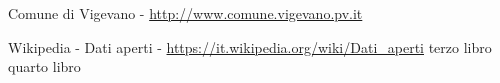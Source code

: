 \begin{thebibliography}{100}

 Comune di Vigevano - \url{http://www.comune.vigevano.pv.it}


  Wikipedia - Dati aperti - \url{https://it.wikipedia.org/wiki/Dati_aperti}
 terzo libro
 quarto libro
\end{thebibliography} 